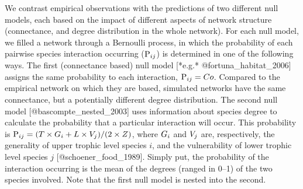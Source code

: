 We contrast empirical observations with the predictions of two different
null models, each based on the impact of different aspects of network
structure (connectance, and degree distribution in the whole network). For
each null model, we filled a network through a Bernoulli process, in
which the probability of each pairwise species interaction occurring
($\mathrm{P}\sb{ij}$) is determined in one of the following ways. The first
(connectance based) null model [*e.g.* @fortuna_habitat_2006] assigns the
same probability to each interaction, $\mathrm{P}\sb{ij} = Co$. Compared
to the empirical network on which they are based, simulated networks have
the same connectance, but a potentially different degree distribution. The
second null model [@bascompte_nested_2003] uses information about species
degree to calculate the probability that a particular interaction will
occur. This probability is $\mathrm{P}\sb{ij} = (T\times G\sb{i}+L\times
V\sb{j})/(2\times Z)$, where $G\sb{i}$ and $V\sb{j}$ are, respectively, the
generality of upper trophic level species $i$, and the vulnerability of lower
trophic level species $j$ [@schoener_food_1989]. Simply put, the probability
of the interaction occurring is the mean of the degrees (ranged in 0--1) of the
two species involved. Note that the first null model is nested into the second.
